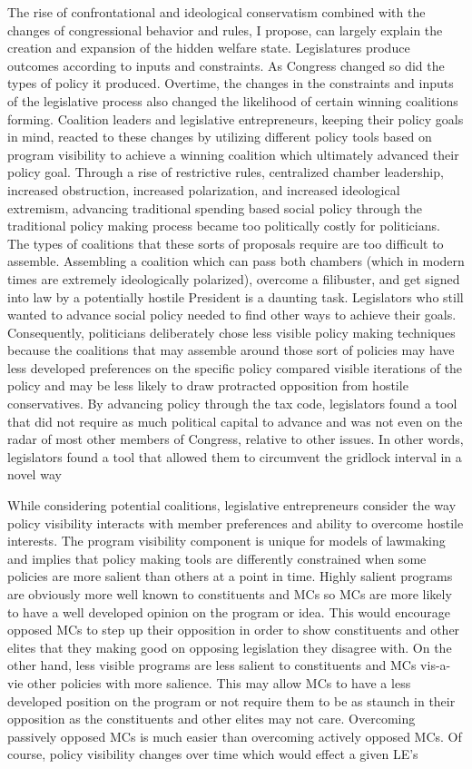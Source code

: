 \documentclass[12pt]{article}
\begin{document}
The rise of confrontational and ideological conservatism combined with the changes of congressional behavior and rules, I propose, can largely explain the creation and expansion of the hidden welfare state. Legislatures produce outcomes according to inputs and constraints. As Congress changed so did the types of policy it produced. Overtime, the changes in the constraints and inputs of the legislative process also changed the likelihood of certain winning coalitions forming. Coalition leaders and legislative entrepreneurs, keeping their policy goals in mind, reacted to these changes by utilizing different policy tools based on program visibility to achieve a winning coalition which ultimately advanced their policy goal. Through a rise of restrictive rules, centralized chamber leadership, increased obstruction, increased polarization, and increased ideological extremism, advancing traditional spending based social policy through the traditional policy making process became too politically costly for politicians. The types of coalitions that these sorts of proposals require are too difficult to assemble. Assembling a coalition which can pass both chambers (which in modern times are extremely ideologically polarized), overcome a filibuster, and get signed into law by a potentially hostile President is a daunting task. Legislators who still wanted to advance social policy needed to find other ways to achieve their goals. Consequently, politicians deliberately chose less visible policy making techniques because the coalitions that may assemble around those sort of policies may have less developed preferences on the specific policy compared visible iterations of the policy and may be less likely to draw protracted opposition from hostile conservatives. By advancing policy through the tax code, legislators found a tool that did not require as much political capital to advance and was not even on the radar of most other members of Congress, relative to other issues. In other words, legislators found a tool that allowed them to circumvent the gridlock interval in a novel way \citep{krehbiel1998, binder2003}

While considering potential coalitions, legislative entrepreneurs consider the way policy visibility interacts with member preferences and ability to overcome hostile interests. The program visibility component is unique for models of lawmaking and implies that policy making tools are differently constrained when some policies are more salient than others at a point in time. Highly salient programs are obviously more well known to constituents and MCs so MCs are more likely to have a well developed opinion on the program or idea. This would encourage opposed MCs to step up their opposition in order to show constituents and other elites that they making good on opposing legislation they disagree with. On the other hand, less visible programs are less salient to constituents and MCs vis-a-vie other policies with more salience. This may allow MCs to have a less developed position on the program or not require them to be as staunch in their opposition as the constituents and other elites may not care. Overcoming passively opposed MCs is much easier than overcoming actively opposed MCs. Of course, policy visibility changes over time which would effect a given LE's 
\end{document}
